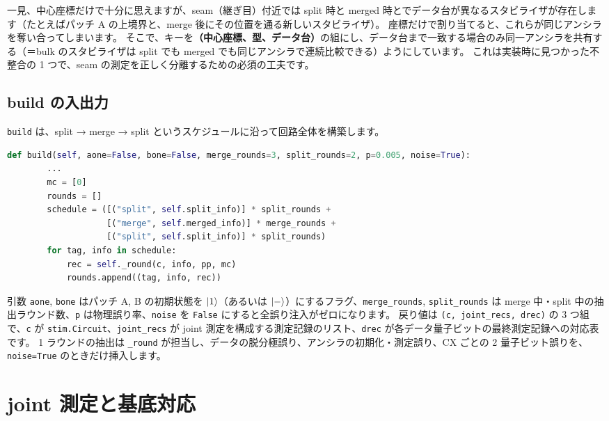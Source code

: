 一見、中心座標だけで十分に思えますが、seam（継ぎ目）付近では split 時と merged 時とでデータ台が異なるスタビライザが存在します（たとえばパッチ A の上境界と、merge 後にその位置を通る新しいスタビライザ）。
座標だけで割り当てると、これらが同じアンシラを奪い合ってしまいます。
そこで、キーを\textbf{（中心座標、型、データ台）}の組にし、データ台まで一致する場合のみ同一アンシラを共有する（＝bulk のスタビライザは split でも merged でも同じアンシラで連続比較できる）ようにしています。
これは実装時に見つかった不整合の 1 つで、seam の測定を正しく分離するための必須の工夫です。

\subsection{build の入出力}

\texttt{build} は、split → merge → split というスケジュールに沿って回路全体を構築します。

\begin{lstlisting}[language=Python, caption={build のスケジュール構築（\codepath{src/stages/02_circuit_level/src/ftqc/circuit_level_merge.py}）}]
    def build(self, aone=False, bone=False, merge_rounds=3, split_rounds=2, p=0.005, noise=True):
        ...
        mc = [0]
        rounds = []
        schedule = ([("split", self.split_info)] * split_rounds +
                    [("merge", self.merged_info)] * merge_rounds +
                    [("split", self.split_info)] * split_rounds)
        for tag, info in schedule:
            rec = self._round(c, info, pp, mc)
            rounds.append((tag, info, rec))
\end{lstlisting}

引数 \texttt{aone}, \texttt{bone} はパッチ A, B の初期状態を $\ket{1}$（あるいは $\ket{-}$）にするフラグ、\texttt{merge\_rounds}, \texttt{split\_rounds} は merge 中・split 中の抽出ラウンド数、\texttt{p} は物理誤り率、\texttt{noise} を \texttt{False} にすると全誤り注入がゼロになります。
戻り値は \texttt{(c, joint\_recs, drec)} の 3 つ組で、\texttt{c} が \texttt{stim.Circuit}、\texttt{joint\_recs} が joint 測定を構成する測定記録のリスト、\texttt{drec} が各データ量子ビットの最終測定記録への対応表です。
1 ラウンドの抽出は \texttt{\_round} が担当し、データの脱分極誤り、アンシラの初期化・測定誤り、CX ごとの 2 量子ビット誤りを、\texttt{noise=True} のときだけ挿入します。

\section{joint 測定と基底対応}\label{sec:joint}

